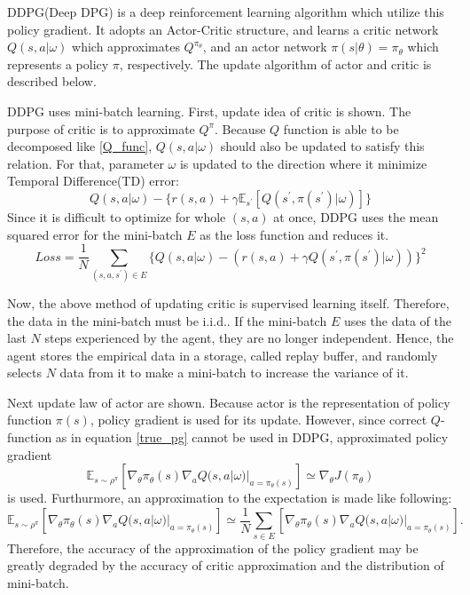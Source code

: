 \documentclass[english, dvipdfmx]{ampmt}             %
\newcommand{\expect}{\mathbb{E}}
\begin{document}
DDPG(Deep DPG) is a deep reinforcement learning algorithm which utilize this policy gradient. It adopts an Actor-Critic structure, and learns a critic network $Q(s,a|\omega)$ which approximates $Q^{\pi_{\theta}}$, and an actor network $\pi(s|\theta)=\pi_{\theta}$ which represents a policy $\pi$, respectively. The update algorithm of actor and critic is described below.\par
DDPG uses mini-batch learning. First, update idea of critic is shown. The purpose of critic is to approximate $Q^{\pi}$. Because $Q$ function is able to be decomposed like \eqref{Q_func}, $Q(s,a|\omega)$ should also be updated to satisfy this relation. For that, parameter $\omega$ is updated to the direction where it minimize Temporal Difference(TD) error: 
\begin{equation}
	Q(s,a|\omega) - \{r(s,a)+\gamma \expect_{s^{\prime}}[Q(s^{\prime},\pi(s^{\prime})|\omega)]\}
\end{equation}
Since it is difficult to optimize for whole $(s,a)$ at once, DDPG uses the mean squared error for the mini-batch $E$ as the loss function and reduces it. 
\begin{equation}
	Loss = \frac{1}{N}\sum_{(s,a,s^{\prime})\in E} \{Q(s,a|\omega) - (r(s,a)+\gamma Q(s^{\prime},\pi(s^{\prime})|\omega))\}^2
\end{equation}\par
Now, the above method of updating critic is supervised learning itself. Therefore, the data in the mini-batch must be i.i.d.. If the mini-batch $E$ uses the data of the last $N$ steps experienced by the agent, they are no longer independent. Hence, the agent stores the empirical data in a storage, called replay buffer, and randomly selects $N$ data from it to make a mini-batch to increase the variance of it.\par
Next update law of actor are shown. Because actor is the representation of policy function $\pi(s)$, policy gradient is used for its update. However, since correct $Q$-function as in equation \eqref{true_pg} cannot be used in DDPG, approximated policy gradient
\begin{equation}
	\expect_{s\sim\rho^{\pi}}[\nabla_{\theta}\pi_{\theta}(s)\nabla_{a}Q(s, a|\omega)|_{a=\pi_{\theta}(s)}] \simeq \nabla_{\theta}J(\pi_{\theta}) 
\end{equation}
 is used. Furthurmore, an approximation to the expectation is made like following:
 \begin{equation}
	\expect_{s\sim\rho^{\pi}}[\nabla_{\theta}\pi_{\theta}(s)\nabla_{a}Q(s, a|\omega)|_{a=\pi_{\theta}(s)}] \simeq \frac{1}{N}\sum_{s\in E}[\nabla_{\theta}\pi_{\theta}(s)\nabla_{a}Q(s, a|\omega)|_{a=\pi_{\theta}(s)}]. \label{expectation_approximation}
\end{equation}
Therefore, the accuracy of the approximation of the policy gradient may be greatly degraded by the accuracy of critic approximation and the distribution of mini-batch.
\end{document}
